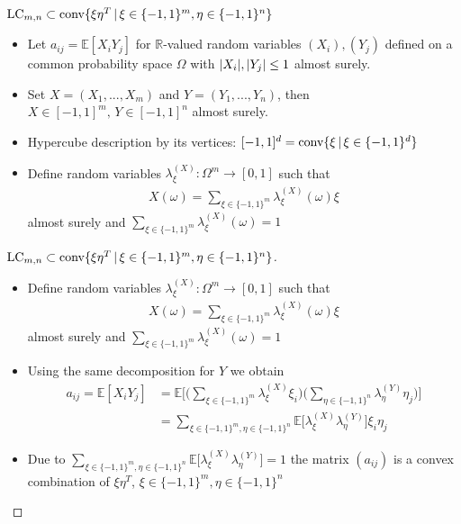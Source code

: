 \begin{frame}
\begin{block}{$   \textup{LC}_{m,n}  \subset \textup{conv} \{  \xi\eta^T \, | \, \xi \in \{-1,1\}^m, \eta \in \{-1,1\}^n     \} $}
	\begin{itemize}
		\item<1-> Let $ a_{ij} = \mathbb{E}[X_iY_j] $ for $ \mathbb{R} $-valued random variables $ (X_i),(Y_j) $ defined on a common probability space $ \Omega $ with $ {\left|{X_i}\right|},{\left|{Y_j}\right|} \le 1 $ almost surely. 
		\item <2->Set $ X= (X_1,...,X_m) $ and $ Y= (Y_1,...,Y_n) $, then $ X \in [-1,1]^m, \, Y \in [-1,1]^n $ almost surely.
		\item<3-> Hypercube description by its vertices: $ [-1,1]^d = \textup{conv} \{\xi \, | \, \xi \in \{-1,1 \}^d \}$ 
		\item<4-> Define random variables $ \lambda_{\xi}^{(X)}: \Omega^m \to [0,1] $ such that 
			\begin{align*}
			X(\omega) = \sum_{\xi \in \{-1,1\}^m}\lambda_{\xi}^{(X)}(\omega)\xi
			\end{align*} 
			almost surely 
			and $ \sum_{\xi \in \{-1,1\}^m}\lambda_{\xi}^{(X)}(\omega) = 1  $
	\end{itemize}
\end{block}
\end{frame}

\begin{frame}
	\begin{proof}[$   \textup{LC}_{m,n}  \subset \textup{conv} \{  \xi\eta^T \, | \, \xi \in \{-1,1\}^m, \eta \in \{-1,1\}^n     \} $]
		\begin{itemize}
			\item<1-> {\footnotesize Define random variables $ \lambda_{\xi}^{(X)}: \Omega^m \to [0,1] $ such that 
			\begin{align*}
			X(\omega) = \sum_{\xi \in \{-1,1\}^m}\lambda_{\xi}^{(X)}(\omega)\xi
			\end{align*} 
			almost surely 
			and $ \sum_{\xi \in \{-1,1\}^m}\lambda_{\xi}^{(X)}(\omega) = 1  $}
			\item<1-> Using the same decomposition for $ Y $ we obtain 
			\begin{align*}
			a_{ij} = \mathbb{E}[X_iY_j] &= \mathbb{E} \big [ \big (\sum_{\xi \in \{-1,1\}^m}\lambda_{\xi}^{(X)}\xi_i \big  ) \big (\sum_{\eta \in \{-1,1\}^n}\lambda_{\eta}^{(Y)}\eta_j \big ) \big ]   \\
			&= \sum_{\xi \in \{-1,1\}^m, \eta \in \{-1,1\}^n} \mathbb{E}\big [\lambda_{\xi}^{(X)}\lambda_{\eta}^{(Y)} \big ] \xi_i \eta_j  
			\end{align*}
			\item<2-> Due to $\sum_{\xi \in \{-1,1\}^m, \eta \in \{-1,1\}^n}  \mathbb{E}\big [\lambda_{\xi}^{(X)}\lambda_{\eta}^{(Y)} \big ] = 1 $
			the matrix $ (a_{ij}) $ is a convex combination of $ \xi \eta^T $, $ \xi \in \{-1,1\}^m, \eta \in \{-1,1 \}^n $
		\end{itemize}
	\end{proof}
\end{frame}



